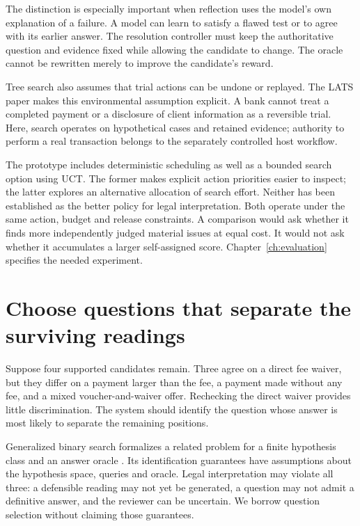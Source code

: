 \documentclass[12pt,a4paper,oneside,openany]{book}
\begin{document}
The distinction is especially important when reflection uses the model's own
explanation of a failure. A model can learn to satisfy a flawed test or to agree
with its earlier answer. The resolution controller must keep the authoritative
question and evidence fixed while allowing the candidate to change. The oracle
cannot be rewritten merely to improve the candidate's reward.

Tree search also assumes that trial actions can be undone or replayed.
The LATS paper makes this environmental assumption explicit. A bank
cannot treat a completed payment or a disclosure of client information
as a reversible trial. Here, search operates on hypothetical cases and
retained evidence; authority to perform a real transaction belongs to
the separately controlled host workflow.

The prototype includes deterministic scheduling as well as a bounded search
option using UCT. The former makes explicit action priorities easier to inspect;
the latter explores an alternative allocation of search effort. Neither has
been established as the better policy for legal interpretation. Both operate
under the same action, budget and release constraints. A comparison would ask whether it finds more independently judged
material issues at equal cost. It would not ask whether it accumulates a larger
self-assigned score. Chapter~\ref{ch:evaluation} specifies the needed experiment.

\section{Choose questions that separate the surviving readings}
\label{merge:M05:08}


Suppose four supported candidates remain. Three agree on a direct fee waiver,
but they differ on a payment larger than the fee, a payment made without any fee,
and a mixed voucher-and-waiver offer. Rechecking the direct waiver provides
little discrimination. The system should identify the question whose answer is
most likely to separate the remaining positions.

Generalized binary search formalizes a related problem for a finite hypothesis
class and an answer oracle \citep[Figure 1 and sections I--II]{gbs2011}. Its
identification guarantees have assumptions about the hypothesis space, queries
and oracle. Legal interpretation may violate all three: a defensible reading may
not yet be generated, a question may not admit a definitive answer, and the
reviewer can be uncertain. We borrow question selection without claiming those
guarantees.
\end{document}
